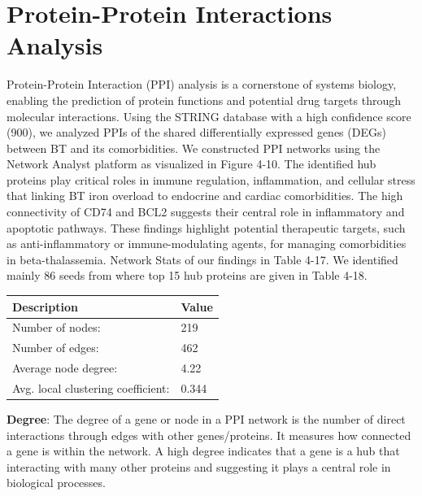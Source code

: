 \section{Protein-Protein Interactions Analysis}
\label{sec:sec4_6}
Protein-Protein Interaction (PPI) analysis is a cornerstone of systems biology, enabling the prediction of protein functions and potential drug targets through molecular interactions. Using the STRING database with a high confidence score (900), we analyzed PPIs of the shared differentially expressed genes (DEGs) between BT and its comorbidities. We constructed PPI networks using the Network Analyst platform as visualized in Figure 4-10. The identified hub proteins play critical roles in immune regulation, inflammation, and cellular stress that linking BT iron overload to endocrine and cardiac comorbidities. The high connectivity of CD74 and BCL2 suggests their central role in inflammatory and apoptotic pathways. These findings highlight potential therapeutic targets, such as anti-inflammatory or immune-modulating agents, for managing comorbidities in beta-thalassemia. Network Stats of our findings in Table 4-17. We identified mainly 86 seeds from where top 15 hub proteins are given in Table 4-18. \\

\begin{table}[H]
    \centering
    \begin{tabular}{|p{4cm}|p{3cm}|}
        \hline
        \textbf{Description} & \textbf{Value} \\
        \hline
        Number of nodes: & 219 \\
        \hline
        Number of edges: & 462 \\
        \hline
        Average node degree: & 4.22 \\
        \hline
        Avg. local clustering coefficient: & 0.344 \\
        \hline
    \end{tabular}
    \label{tab:network_stats_ppi}
\end{table}

\textbf{Degree}: The degree of a gene or node in a PPI network is the number of direct interactions through edges with other genes/proteins. It measures how connected a gene is within the network. A high degree indicates that a gene is a hub that interacting with many other proteins and suggesting it plays a central role in biological processes.\\

